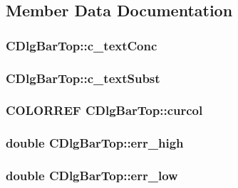 \subsection{Member Data Documentation}
\hypertarget{classCDlgBarTop_ae5b7ad488c56456a821e7b62e5414bc9}{
\subsubsection[{c\_\-textConc}]{ {\bf CDlgBarTop::c\_\-textConc}}}
\label{classCDlgBarTop_ae5b7ad488c56456a821e7b62e5414bc9}
\hypertarget{classCDlgBarTop_ad72ba99e097e6b29da3af65a5627d7e7}{
\subsubsection[{c\_\-textSubst}]{ {\bf CDlgBarTop::c\_\-textSubst}}}
\label{classCDlgBarTop_ad72ba99e097e6b29da3af65a5627d7e7}
\hypertarget{classCDlgBarTop_ae3d18a7b1e0f9e44dd258619bc8e3376}{
\subsubsection[{curcol}]{\setlength{\rightskip}{0pt plus 5cm}COLORREF {\bf CDlgBarTop::curcol}}}
\label{classCDlgBarTop_ae3d18a7b1e0f9e44dd258619bc8e3376}
\hypertarget{classCDlgBarTop_ace74fac5678befd5df68bfe6714556a9}{
\subsubsection[{err\_\-high}]{\setlength{\rightskip}{0pt plus 5cm}double {\bf CDlgBarTop::err\_\-high}}}
\label{classCDlgBarTop_ace74fac5678befd5df68bfe6714556a9}
\hypertarget{classCDlgBarTop_aa7d6c3b4e42e89d0224e0c9443410b75}{
\subsubsection[{err\_\-low}]{\setlength{\rightskip}{0pt plus 5cm}double {\bf CDlgBarTop::err\_\-low}}}
